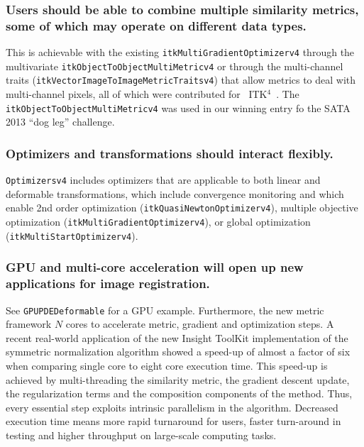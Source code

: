 \documentclass{frontiersSCNS}
\newcommand{\tk}{~ITK$^{\text{4}}$~}
\begin{document}
\subsubsection{Users should be able to combine multiple similarity metrics, some of which may operate on different data types.}
This is achievable with the existing \texttt{itkMultiGradientOptimizerv4}
through the multivariate \texttt{itkObjectToObjectMultiMetricv4} or
through the multi-channel traits
(\texttt{itkVectorImageToImageMetricTraitsv4}) that allow metrics to deal with
multi-channel pixels, all of which were contributed for \tk.  The
\texttt{itkObjectToObjectMultiMetricv4} was used in our winning entry
fo the SATA 2013 ``dog leg'' challenge. 

\subsubsection{Optimizers and transformations should interact flexibly.}
\texttt{Optimizersv4} includes optimizers that are applicable to both linear and deformable transformations, which include convergence monitoring and which enable 2nd order optimization (\texttt{itkQuasiNewtonOptimizerv4}), multiple objective optimization (\texttt{itkMultiGradientOptimizerv4}), or global optimization (\texttt{itkMultiStartOptimizerv4}).  

\subsubsection{GPU and multi-core acceleration will open up new applications for image registration.}
See \texttt{GPUPDEDeformable} for a GPU example.  Furthermore, the new metric framework $N$ cores to accelerate metric, gradient and optimization steps.  A recent real-world application of the new Insight ToolKit implementation of the symmetric normalization algorithm showed a speed-up of almost a factor of six when comparing single core to eight core execution time. This speed-up is achieved by multi-threading the similarity metric, the gradient descent update, the regularization terms and the composition components of the method. Thus, every essential step exploits intrinsic parallelism in the algorithm. Decreased execution time means more rapid turnaround for users, faster turn-around in testing and higher throughput on large-scale computing tasks.  
\end{document}
